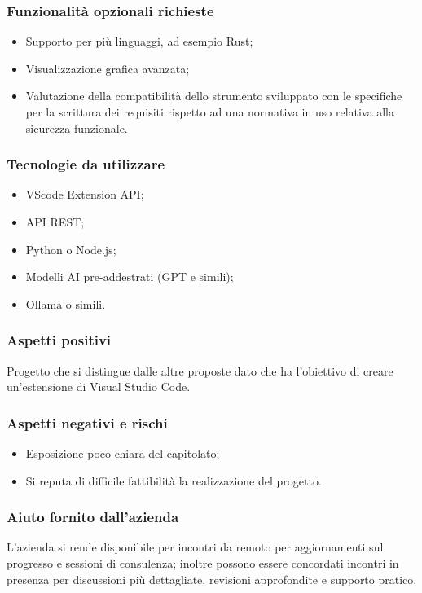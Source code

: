 \documentclass[10pt]{article}
\begin{document}
\subsubsection{Funzionalità opzionali richieste}
\begin{itemize}
    \item Supporto per più linguaggi, ad esempio Rust;
    \item Visualizzazione grafica avanzata;
    \item Valutazione della compatibilità dello strumento sviluppato con le specifiche per la scrittura dei requisiti rispetto ad una normativa in uso relativa alla sicurezza funzionale.
\end{itemize}
\subsubsection{Tecnologie da utilizzare}
\begin{itemize}
    \item VScode Extension API;
    \item API REST;
    \item Python o Node.js;
    \item Modelli AI pre-addestrati (GPT e simili);
    \item Ollama o simili.
\end{itemize}
\subsubsection{Aspetti positivi}
Progetto che si distingue dalle altre proposte dato che ha l'obiettivo di creare un'estensione di Visual Studio Code.
\subsubsection{Aspetti negativi e rischi}
\begin{itemize}
    \item Esposizione poco chiara del capitolato;
    \item Si reputa di difficile fattibilità la realizzazione del progetto.
\end{itemize}
\subsubsection{Aiuto fornito dall'azienda}
L'azienda si rende disponibile per incontri da remoto per aggiornamenti sul progresso e sessioni di consulenza; inoltre possono essere concordati incontri in presenza per discussioni più dettagliate, revisioni approfondite e supporto pratico.
\end{document}
